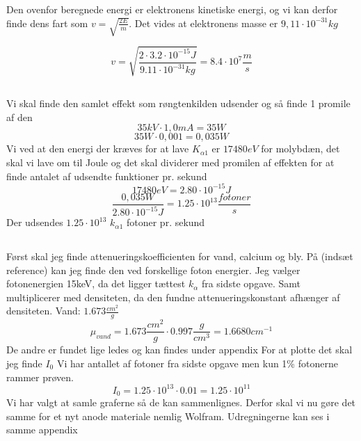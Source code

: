 \documentclass[a4paper,twoside]{article}
\begin{document}
\subsection{}
Den ovenfor beregnede energi er elektronens kinetiske energi, og vi kan derfor finde dens fart som $v=\sqrt{\frac{2E}{m}}$.
Det vides at elektronens masse er $9,11\cdot10^{-31} kg$

\begin {equation*}
v=\sqrt{\frac{2\cdot3.2\cdot10^{-15}J}{9.11\cdot10^{-31}kg}}=8.4\cdot10^7 \frac{m}{s}
\end{equation*}
\subsection{}
Vi skal finde den samlet effekt som røngtenkilden udsender og så finde 1 promile af den 
\begin{equation*}
35kV\cdot1,0mA=35W
\end{equation*}
\begin{equation*}
    35W\cdot0,001=0,035W
\end{equation*}
Vi ved at den energi der kræves for at lave $K_{\alpha1}$ er $17480eV$ for molybdæn, det skal vi lave om til Joule og det skal dividerer med promilen af effekten for at finde antalet af udsendte funktioner pr. sekund
\begin{equation}
    17480eV=2.80\cdot10^{-15}J
\end{equation}
\begin{equation*}
     \frac{0,035W}{2.80\cdot10^{-15}J}=1.25\cdot10^{13}\frac{fotoner}{s} 
\end{equation*}
Der udsendes $1.25\cdot10^{13}$ $k_{\alpha1}$ fotoner pr. sekund
\subsection{}
Først skal jeg finde attenueringskoefficienten for vand, calcium og bly. På (indsæt reference) kan jeg finde den ved forskellige foton energier. Jeg vælger fotonenergien 15keV, da det ligger tættest $k_{\alpha}$ fra sidste opgave. Samt multiplicerer med densiteten, da den fundne attenueringskonstant afhænger af densiteten.
Vand: $1.673 \frac{cm^2}{g}$
\begin{equation*}
    \mu_{vand}=1.673 \frac{cm^2}{g}\cdot0.997 \frac{g}{cm^3}=1.6680 cm^{-1}
\end{equation*}
De andre er fundet lige ledes og kan findes under appendix
For at plotte det skal jeg finde $I_0$
Vi har antallet af fotoner fra sidste opgave men kun 1\% fotonerne rammer prøven. 
\begin{equation*}
   I_0= 1.25\cdot10^{13}\cdot0.01=1.25\cdot10^{11} 
 
\end{equation*}
Vi har valgt at samle graferne så de kan sammenlignes. Derfor skal vi nu gøre det samme for et nyt anode materiale nemlig Wolfram. 
Udregningerne kan ses i samme appendix
\end{document}
